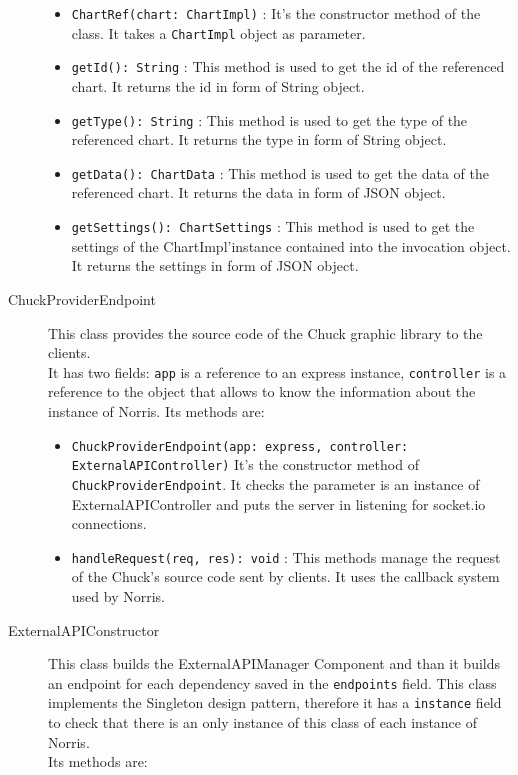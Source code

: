 \begin{description}
		\begin{itemize}
			\item \texttt{ChartRef(chart: ChartImpl)} : It's the constructor method of the class. It takes a \texttt{ChartImpl} object as parameter.
			\item \texttt{getId(): String} : This method is used to get the id of the referenced chart. It returns the id in form of String object.
			\item \texttt{getType(): String} : This method is used to get the type of the referenced chart. It returns the type in form of String object.
			\item \texttt{getData(): ChartData} : This method is used to get the data of the referenced chart. It returns the data in form of JSON object.
			\item \texttt{getSettings(): ChartSettings} : This method is used to get the settings of the ChartImpl'instance contained into the invocation object. It returns the settings in form of JSON object.
		\end{itemize}
	\item[ChuckProviderEndpoint] This class provides the source code of the Chuck graphic library to the clients.\\It has two fields: \texttt{app} is a reference to an express instance, \texttt{controller} is a reference to the object that allows to know the information about the instance of Norris. Its methods are:
	\begin{itemize}
		\item \texttt{ChuckProviderEndpoint(app: express, controller: ExternalAPIController)} It's the constructor method of \texttt{ChuckProviderEndpoint}. It checks the parameter is an instance of ExternalAPIController and puts the server in listening for socket.io connections.
		\item \texttt{handleRequest(req, res): void} : This methods manage the request of the Chuck's source code sent by clients. It uses the callback system used by Norris.
	\end{itemize}
	\item[ExternalAPIConstructor] This class builds the ExternalAPIManager Component and than it builds an endpoint for each dependency saved in the \texttt{endpoints} field. This class implements the Singleton design pattern, therefore it has a \texttt{instance} field to check that there is an only instance of this class of each instance of Norris.\\Its methods are:
	\begin{itemize}

\end{itemize}
\end{description}
